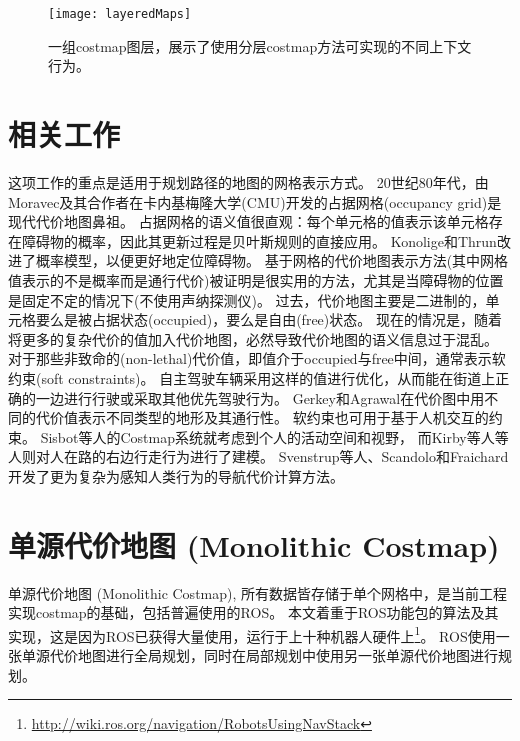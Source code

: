 \begin{figure}[!htb]
	\centering
	\texttt{[image: layeredMaps]}
	\caption{一组costmap图层，展示了使用分层costmap方法可实现的不同上下文行为。}
	\label{fig:costMap:layers}
\end{figure}

\section{相关工作}\label{sec:relatework}
这项工作的重点是适用于规划路径的地图的网格表示方式。 
20世纪80年代，由Moravec及其合作者在卡内基梅隆大学(CMU)开发的占据网格(occupancy grid)是现代代价地图鼻祖\cite{matthies1988integration,moravec1989sensor}。 
占据网格的语义值很直观：每个单元格的值表示该单元格存在障碍物的概率，因此其更新过程是贝叶斯规则的直接应用。 
Konolige\cite{konolige1997improved}和Thrun\cite{thrun2001learning}改进了概率模型，以便更好地定位障碍物。
基于网格的代价地图表示方法(其中网格值表示的不是概率而是通行代价)被证明是很实用的方法，尤其是当障碍物的位置是固定不定的情况下(不使用声纳探测仪)。
过去，代价地图主要是二进制的，单元格要么是被占据状态(occupied)，要么是自由(free)状态。
现在的情况是，随着将更多的复杂代价的值加入代价地图，必然导致代价地图的语义信息过于混乱。
对于那些非致命的(non-lethal)代价值，即值介于occupied与free中间，通常表示软约束(soft constraints)。
自主驾驶车辆采用这样的值进行优化，从而能在街道上正确的一边进行行驶或采取其他优先驾驶行为\cite{ferguson2008efficiently}。
Gerkey和Agrawal\cite{gerkey2008break}在代价图中用不同的代价值表示不同类型的地形及其通行性。
软约束也可用于基于人机交互的约束。 
Sisbot等人的Costmap系统\cite{sisbot2007human}就考虑到个人的活动空间和视野，
而Kirby等人\cite{kirby2009companion}等人则对人在路的右边行走行为进行了建模。
Svenstrup等人\cite{svenstrup2009pose}、Scandolo和Fraichard\cite{scandolo2011anthropomorphic}开发了更为复杂为感知人类行为的导航代价计算方法。


\section{单源代价地图 (Monolithic Costmap)}
\label{sec:mono-costmap}

单源代价地图 (Monolithic Costmap), 所有数据皆存储于单个网格中，是当前工程实现costmap的基础，包括普遍使用的ROS\cite{quigley2009ros}。
本文着重于ROS功能包的算法及其实现，这是因为ROS已获得大量使用，运行于上十种机器人硬件上\footnote{\url{http://wiki.ros.org/navigation/RobotsUsingNavStack}}。
ROS使用一张单源代价地图进行全局规划，同时在局部规划中使用另一张单源代价地图进行规划。


